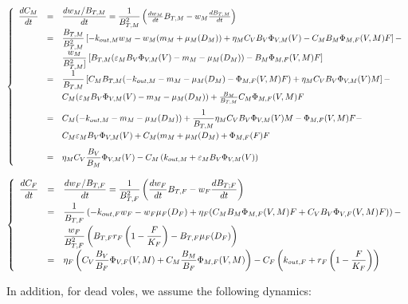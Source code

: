 \documentclass[11pt]{article}
\begin{document}
%
\begin{equation}
\left\lbrace
\begin{array}{c c l}
\dfrac{dC_M}{dt} & = & \dfrac{d w_M / B_{T,M}}{dt} = \dfrac{1}{B_{T,M}^2} \left( \frac{d w_M}{d t} B_{T,M} - w_M \frac{dB_{T,M}}{dt} \right)\\[3mm]
%
& = & \dfrac{B_{T,M}}{B_{T,M}^2} \left[ - k_{out,M} w_M - w_M(m_M + \mu_M(D_M)) + \eta_M C_V B_V \Phi_{V,M}(V)  - C_M B_M \Phi_{M,F}(V,M)F \right] - \\[3mm]
& &\dfrac{w_M}{B_{T,M}^2]} \left[ B_{T,M} (\varepsilon_M B_V \Phi_{V,M}(V) - m_M - \mu_M(D_M) ) - B_M \Phi_{M,F}(V,M)F  \right]\\[3mm]
%
& = &\dfrac{1}{B_{T,M}} \left[ C_M B_{T,M} (- k_{out,M} - m_M - \mu_M(D_M)- \Phi_{M,F}(V,M)F) + \eta_M C_V B_V \Phi_{V,M}(V)M  \right]  -  \\[3mm]
&  & C_M(\varepsilon_M B_V \Phi_{V,M}(V) - m_M - \mu_M(D_M)) + \frac{B_M}{B_{T,M}} C_M \Phi_{M,F}(V,M)F\\[3mm]
%
& = & C_M(-k_{out,M} - m_M - \mu_M(D_M)) + \dfrac{1}{B_{T,M}} \eta_M C_V B_V \Phi_{V,M}(V)M - \Phi_{M,F}(V,M)F - \\[3mm]
&  & C_M \varepsilon_M B_V \Phi_{V,M}(V) + C_M(m_M + \mu_M(D_M) + \Phi_{M,F}(F)F \\[3mm]
%
& = & \eta_M C_V \dfrac{B_V}{B_M} \Phi_{V,M}(V) - C_M \left( k_{out,M} + \varepsilon_M B_V \Phi_{V,M}(V)\right)
\end{array}
\right.
\end{equation}


\begin{equation}
\left\lbrace
\begin{array}{c c l}
\dfrac{d C_F}{dt} & = & \dfrac{d w_F / B_{T,F}}{dt} = \dfrac{1}{B_{T,F}^2} \left( \dfrac{d w_F}{dt} B_{T,F} - w_F \dfrac{d B_{T;F}}{dt}\right) \\[3mm]
%
& = & \dfrac{1}{B_{T,F}} \left( - k_{out,F}w_F - w_F \mu_F(D_F) + \eta_F(C_M B_M \Phi_{M,F}(V,M)F + C_V B_V \Phi_{V,F}(V,M)F) \right) - \\[3mm] 
& & \dfrac{w_F}{B_{T,F}^2} \left( B_{T,F} r_F\left( 1- \dfrac{F}{K_F} \right) - B_{T,F} \mu_F(D_F) \right) \\[3mm]
%
& = & \eta_F \left( C_V \dfrac{B_V}{B_F} \Phi_{V,F}(V,M) + C_M \dfrac{B_M}{B_F} \Phi_{M,F}(V,M)  \right) - C_F \left( k_{out,F} + r_F\left( 1 - \dfrac{F}{K_F} \right)\right) 
\end{array}
\right.
\end{equation}


%
In addition, for dead voles, we assume the following dynamics:
\end{document}
